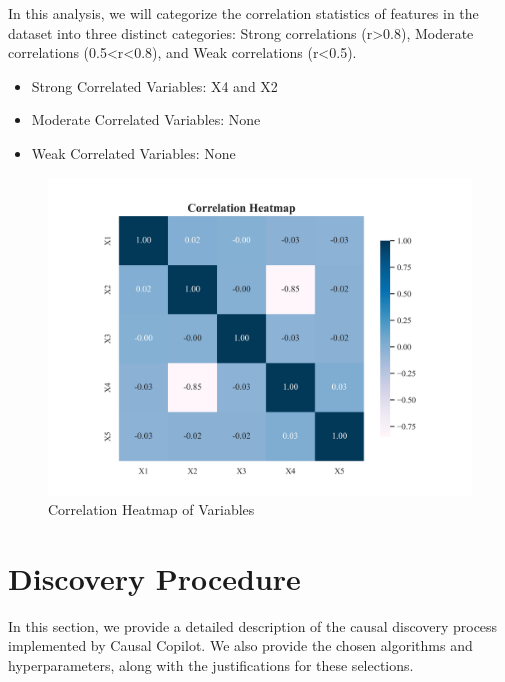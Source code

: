\documentclass{article}
\begin{document}
\begin{minipage}[t]{0.5\linewidth}
    In this analysis, we will categorize the correlation statistics of features in the dataset into three distinct categories: Strong correlations (r>0.8), Moderate correlations (0.5<r<0.8), and Weak correlations (r<0.5).

\begin{itemize}
\item Strong Correlated Variables: X4 and X2
\item Moderate Correlated Variables: None
\item Weak Correlated Variables: None
\end{itemize}
\vfill
\end{minipage}
\hfill
\begin{minipage}[t]{0.5\linewidth}
    \begin{figure}[H]
        \centering
        \vspace{-1.5cm}
        \includegraphics[width=\linewidth]{./demo_data/20241104_155051/Linear_Gaussian_data/output_graph/eda_corr.jpg}
        \caption{\label{fig:corr}Correlation Heatmap of Variables}
    \end{figure}
\end{minipage}

\section{Discovery Procedure}

In this section, we provide a detailed description of the causal discovery process implemented by Causal Copilot. We also provide the chosen algorithms and hyperparameters, along with the justifications for these selections.
\end{document}
